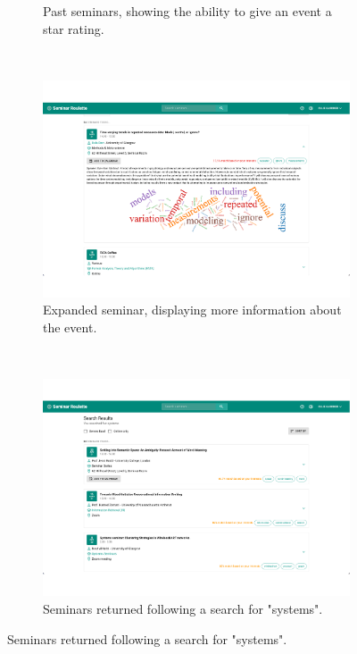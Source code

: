 \documentclass{l4proj}
\begin{document}
\begin{figure}[htb]
\begin{subfigure}[b]{0.49\textwidth}
        \caption{Past seminars, showing the ability to give an event a star rating.}
        \label{fig:final_past_seminars}
    \end{subfigure}
    ~
    \begin{subfigure}[b]{0.49\textwidth}
        \includegraphics[width=\textwidth]{images/final_seminar_expanded.pdf}
        \caption{Expanded seminar, displaying more information about the event.}
        \label{fig:final_seminar_expanded}
    \end{subfigure}
    \\[2ex]
    \begin{subfigure}[b]{0.49\textwidth}
        \includegraphics[width=\textwidth]{images/final_search_results.pdf}
        \caption{Seminars returned following a search for "systems".}
        \label{fig:final_search_results}

\end{subfigure}
\end{figure}
\end{document}
